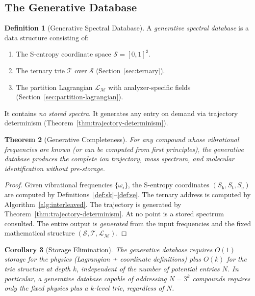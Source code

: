 \documentclass[11pt,twocolumn,a4paper]{article}
\newtheorem{theorem}{Theorem}[section]
\newtheorem{corollary}[theorem]{Corollary}
\theoremstyle{definition}
\newtheorem{definition}[theorem]{Definition}
\theoremstyle{remark}
\newcommand{\Sk}{S_{\mathrm{k}}}
\newcommand{\St}{S_{\mathrm{t}}}
\newcommand{\Se}{S_{\mathrm{e}}}
\newcommand{\Sspace}{\mathcal{S}}
\newcommand{\Depth}{\mathcal{M}}
\newcommand{\Trie}{\mathcal{T}}
\newcommand{\Lagr}{\mathcal{L}}
\begin{document}
\subsection{The Generative Database}
\label{sec:generative-database}

\begin{definition}[Generative Spectral Database]
\label{def:generative-database}
A \emph{generative spectral database} is a data structure consisting of:
\begin{enumerate}[label=(\roman*)]
  \item The S-entropy coordinate space $\Sspace = [0,1]^3$.
  \item The ternary trie $\Trie$ over $\Sspace$ (Section~\ref{sec:ternary}).
  \item The partition Lagrangian $\Lagr_\Depth$ with analyzer-specific fields (Section~\ref{sec:partition-lagrangian}).
\end{enumerate}
It contains \emph{no stored spectra}. It generates any entry on demand via trajectory determinism (Theorem~\ref{thm:trajectory-determinism}).
\end{definition}

\begin{theorem}[Generative Completeness]
\label{thm:generative-completeness}
For any compound whose vibrational frequencies are known (or can be computed from first principles), the generative database produces the complete ion trajectory, mass spectrum, and molecular identification without pre-storage.
\end{theorem}

\begin{proof}
Given vibrational frequencies $\{\omega_i\}$, the S-entropy coordinates $(\Sk, \St, \Se)$ are computed by Definitions~\ref{def:sk}--\ref{def:se}. The ternary address is computed by Algorithm~\ref{alg:interleaved}. The trajectory is generated by Theorem~\ref{thm:trajectory-determinism}. At no point is a stored spectrum consulted. The entire output is \emph{generated} from the input frequencies and the fixed mathematical structure $(\Sspace, \Trie, \Lagr_\Depth)$.
\end{proof}

\begin{corollary}[Storage Elimination]
\label{cor:storage-elimination}
The generative database requires $O(1)$ storage for the physics (Lagrangian + coordinate definitions) plus $O(k)$ for the trie structure at depth $k$, independent of the number of potential entries $N$. In particular, a generative database capable of addressing $N = 3^k$ compounds requires only the fixed physics plus a $k$-level trie, regardless of $N$.
\end{corollary}
\end{document}
